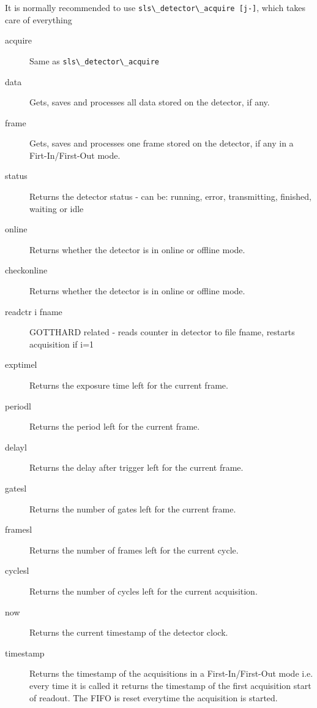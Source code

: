 \documentclass{article}
\begin{document}
It is normally recommended to use \verb=sls\_detector\_acquire [j-]=, which takes care of everything
\begin{description}
\item[acquire] Same as \verb=sls\_detector\_acquire=
\item[data] Gets, saves and processes all data stored on the detector, if any.
\item[frame]  Gets, saves and processes one frame stored on the detector, if any in a Firt-In/First-Out mode.
\item[status] Returns the detector status - can be: running, error, transmitting, finished, waiting or idle
\item[online] Returns whether the detector is in online or offline mode.  
\item[checkonline] Returns whether the detector is in online or offline mode. 
\item[readctr i fname] GOTTHARD related - reads counter in detector to file fname, restarts acquisition if i=1
\item[exptimel]  Returns the exposure time left for the current frame.      
\item[periodl]  Returns the period left for the current frame.  
\item[delayl]    Returns the delay after trigger left for the current frame.  
\item[gatesl]     Returns the number of gates left for the current frame.  
\item[framesl]   Returns the number of frames left for the current cycle.  
\item[cyclesl]      Returns the number of cycles left for the current acquisition. 
\item[now]  Returns the current timestamp of the detector clock.
\item[timestamp]  Returns the timestamp of the acquisitions in a First-In/First-Out mode i.e. every time it is called it returns the timestamp of the first acquisition start of readout. The FIFO is reset everytime the acquisition is started. 
\end{description}
\end{document}
